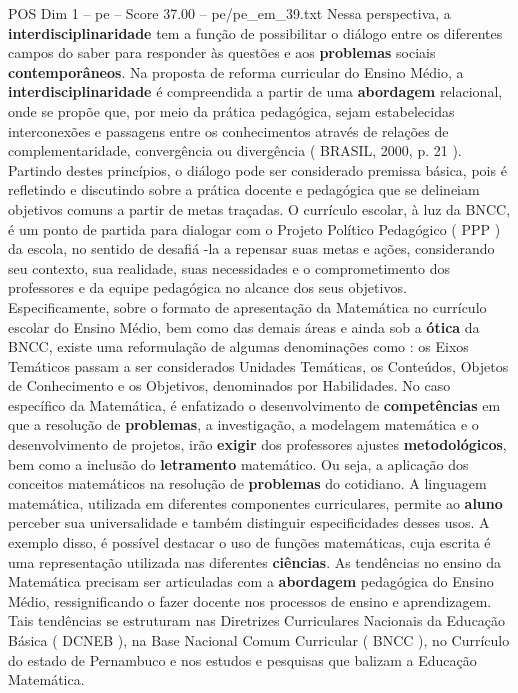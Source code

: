 \begin{textsample}{POS Dim 1 – pe – Score 37.00 – pe/pe\_em\_39.txt}
Nessa perspectiva, a \textbf{interdisciplinaridade} tem a função de possibilitar o diálogo entre os diferentes campos do saber para responder às questões e aos \textbf{problemas} sociais \textbf{contemporâneos}.
Na proposta de reforma curricular do Ensino Médio, a \textbf{interdisciplinaridade} é compreendida a partir de uma \textbf{abordagem} relacional, onde se propõe que, por meio da prática pedagógica, sejam estabelecidas interconexões e passagens entre os conhecimentos através de relações de complementaridade, convergência ou divergência ( BRASIL, 2000, p. 21 ).
Partindo destes princípios, o diálogo pode ser considerado premissa básica, pois é refletindo e discutindo sobre a prática docente e pedagógica que se delineiam objetivos comuns a partir de metas traçadas.
O currículo escolar, à luz da BNCC, é um ponto de partida para dialogar com o Projeto Político Pedagógico ( PPP ) da escola, no sentido de desafiá -la a repensar suas metas e ações, considerando seu contexto, sua realidade, suas necessidades e o comprometimento dos professores e da equipe pedagógica no alcance dos seus objetivos.
Especificamente, sobre o formato de apresentação da Matemática no currículo escolar do Ensino Médio, bem como das demais áreas e ainda sob a \textbf{ótica} da BNCC, existe uma reformulação de algumas denominações como : os Eixos Temáticos passam a ser considerados Unidades Temáticas, os Conteúdos, Objetos de Conhecimento e os Objetivos, denominados por Habilidades.
No caso específico da Matemática, é enfatizado o desenvolvimento de \textbf{competências} em que a resolução de \textbf{problemas}, a investigação, a modelagem matemática e o desenvolvimento de projetos, irão \textbf{exigir} dos professores ajustes \textbf{metodológicos}, bem como a inclusão do \textbf{letramento} matemático.
Ou seja, a aplicação dos conceitos matemáticos na resolução de \textbf{problemas} do cotidiano.
A linguagem matemática, utilizada em diferentes componentes curriculares, permite ao \textbf{aluno} perceber sua universalidade e também distinguir especificidades desses usos.
A exemplo disso, é possível destacar o uso de funções matemáticas, cuja escrita é uma representação utilizada nas diferentes \textbf{ciências}.
As tendências no ensino da Matemática precisam ser articuladas com a \textbf{abordagem} pedagógica do Ensino Médio, ressignificando o fazer docente nos processos de ensino e aprendizagem.
Tais tendências se estruturam nas Diretrizes Curriculares Nacionais da Educação Básica ( DCNEB ), na Base Nacional Comum Curricular ( BNCC ), no Currículo do estado de Pernambuco e nos estudos e pesquisas que balizam a Educação Matemática.

\end{textsample}
